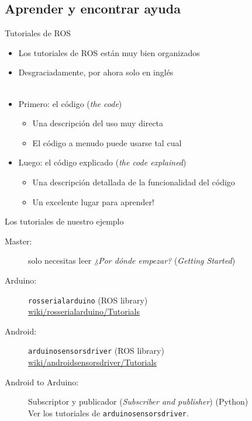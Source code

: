 %
\subsection{Aprender y encontrar ayuda}

  \begin{frame}{Tutoriales de ROS}
    \begin{itemize}
      \item Los tutoriales de ROS están muy bien organizados
      \item Desgraciadamente, por ahora solo en inglés\\~\\
      \item Primero: \alert{el código} (\emph{the code})
        \begin{itemize}
          \item Una descripción del uso muy directa
          \item El código a menudo puede usarse \alert{tal cual}
        \end{itemize}
      \item Luego: \alert{el código explicado} (\emph{the code explained})
        \begin{itemize}
          \item Una descripción detallada de la funcionalidad del código
          \item Un excelente lugar para aprender!
        \end{itemize}
    \end{itemize}
  \end{frame}

  \begin{frame}{Los tutoriales de nuestro ejemplo}
    \begin{description}
      \item[Master:] solo necesitas leer \emph{¿Por dónde empezar?} (\emph{Getting Started})
      \item[Arduino:] \alert{\texttt{rosserial\textunderscore arduino}} (ROS library)\\
                           \href{http://www.ros.org/wiki/rosserial\textunderscore arduino/Tutorials}{wiki/rosserial\textunderscore arduino/Tutorials}\\
      \item[Android:] \alert{\texttt{arduino\textunderscore sensors\textunderscore driver}} (ROS library)\\
                           \href{http://www.ros.org/wiki/android\textunderscore sensors\textunderscore driver/Tutorials}{wiki/android\textunderscore sensors\textunderscore driver/Tutorials}\\
      \item[Android to Arduino:] Subscriptor y publicador (\emph{Subscriber and publisher}) (Python)\\
                                 Ver los tutoriales de \texttt{arduino\textunderscore sensors\textunderscore driver}.
    \end{description}
  \end{frame}

